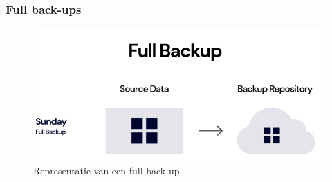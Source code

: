 \subsubsection{Full back-ups}
\begin{figure}[h] 
    \centering
    \captionsetup{justification=centering}
    \includegraphics[width=\textwidth]{img/fullb.png}  
    \caption{Representatie van een full back-up \autocite{Rivas2022}}   
    \label{fig:fullback-up}           
\end{figure}
